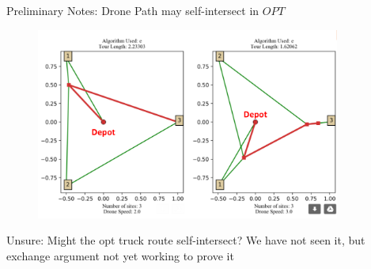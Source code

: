 \documentclass{beamer}
\begin{document}
\begin{frame}{Preliminary Notes: Drone Path may self-intersect in $OPT$}

 \begin{figure}
    \centering
    \includegraphics[width=10cm]{slide_imgs/drone_path_self_intersect.png}
  \end{figure}

\begin{center}
   {\color{byzantine} Unsure: Might the opt truck route self-intersect? We have not seen it,
    but exchange argument not yet working to prove it}
\end{center}

\end{frame}
\end{document}
